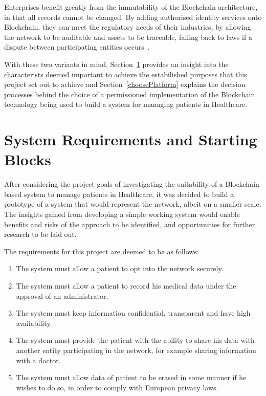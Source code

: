 Enterprises benefit greatly from the immutability of the Blockchain
architecture, in that all records cannot be changed. By adding authorised
identity services onto Blockchain, they can meet the regulatory needs of their
industries, by allowing the network to be auditable and assets to be traceable,
falling back to laws if a dispute between participating entities
occurs~\cite{Barclay2017}.

With these two variants in mind, Section~\ref{choosingHyperledger} provides an
insight into the characterists deemed important to achieve the estabilished
purposes that this project set out to achieve and Section~\ref{choosePlatform}
explains the decision processes behind the choice of a permissioned
implementation of the Blockchain technology being used to build a system for
managing patients in Healthcare.

\section{System Requirements and Starting Blocks}\label{choosingHyperledger}

After considering the project goals of investigating the suitability of a
Blockchain based system to manage patients in Healthcare, it was decided to
build a prototype of a system that would represent the network, albeit on a
smaller scale. The insights gained from developing a simple working system
would enable benefits and risks of the approach to be identified, and
opportunities for further research to be laid out.

The requirements for this project are deemed to be as follows:

\renewcommand{\labelenumi}{\Roman{enumi}.}
\begin{enumerate}
  \item The system must allow a patient to opt into the network securely.
  \item The system must allow a patient to record his medical data under the
    approval of an administrator.
  \item The system must keep information confidential, transparent and have
    high availability.
  \item The system must provide the patient with the ability to share his data
    with another entity participating in the network, for example sharing
    information with a doctor.
  \item The system must allow data  of patient to be erased in some manner if
    he wishes to do so, in order to comply with European privacy laws.
\end{enumerate}

